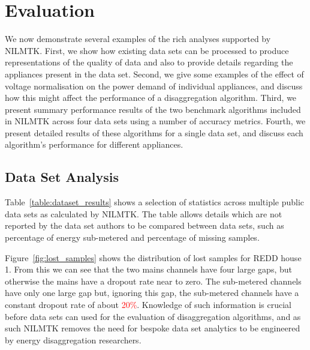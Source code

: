 \documentclass{sig-alternate}
\newcommand{\redcolor}[1]{\textcolor{red}{#1}}
\newcommand{\bluecolor}[1]{\textcolor{blue}{#1}}
\newcommand{\tabref}[1]{Table~\ref{#1}}
\begin{document}
\section{Evaluation}
\label{evaluation}

\noindent
We now demonstrate several examples of the rich analyses supported by NILMTK. First, we show how existing data sets can be processed to produce representations of the quality of data and also to provide details regarding the appliances present in the data set. Second, we give some examples of the effect of voltage normalisation on the power demand of individual appliances, and discuss how this might affect the performance of a disaggregation algorithm. Third, we present summary performance results of the two benchmark algorithms included in NILMTK across four data sets using a number of accuracy metrics. Fourth, we present detailed results of these algorithms for a single data set, and discuss each algorithm's performance for different appliances.

\subsection{Data Set Analysis}
\noindent
\tabref{table:dataset_results} shows a selection of statistics across multiple public data sets as calculated by NILMTK. The table allows details which are not reported by the data set authors to be compared between data sets, such as percentage of energy sub-metered and percentage of missing samples.

Figure~\ref{fig:lost_samples} shows the distribution of lost samples for REDD house 1.  From this we can see that the two mains channels have four large gaps, but otherwise the mains have a dropout rate near to zero. The sub-metered channels have only one large gap but, ignoring this gap, the sub-metered channels have a constant dropout rate of about \redcolor{20\%}. Knowledge of such information is crucial before data sets can used for the evaluation of disaggregation algorithms, and as such NILMTK removes the need for bespoke data set analytics to be engineered by energy disaggregation researchers.
\end{document}
